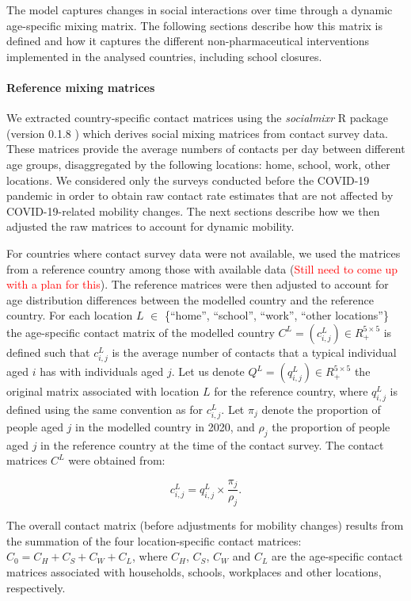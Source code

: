 The model captures changes in social interactions over time through a dynamic age-specific mixing matrix. The following
sections describe how this matrix is defined and how it captures the different non-pharmaceutical interventions implemented
in the analysed countries, including school closures.

\paragraph{Reference mixing matrices}
We extracted country-specific contact matrices using the \textit{socialmixr} R package (version 0.1.8 ) which derives social mixing matrices from 
contact survey data. These matrices provide the average numbers of contacts per day between different age groups, disaggregated by the following 
locations: home, school, work, other locations. We considered only the surveys conducted before the COVID-19 pandemic in order to obtain 
raw contact rate estimates that are not affected by COVID-19-related mobility changes. The next sections describe how we then adjusted 
the raw matrices to account for dynamic mobility.

For countries where contact survey data were not available, we used the matrices from a reference country among 
those with available data (\textcolor{red}{Still need to come up with a plan for this}). The reference matrices were 
then adjusted to account for age distribution differences between the modelled country and the reference country. For each 
location $L$ $\in$ \{``home'', ``school'', ``work'', ``other locations''\} the age-specific contact matrix of the modelled country $C^L = (c_{i,j}^L) \in R_{+}^{5 \times 5}$ 
is defined such that $c_{i,j}^L$ is the average number of contacts that a typical individual aged $i$ has with individuals aged $j$. 
Let us denote $Q^L = (q_{i,j}^L) \in R_{+}^{5 \times 5}$ the original matrix associated with location $L$ for the reference country, where $q_{i,j}^L$ is defined using the same 
convention as for $c_{i,j}^L$. Let $\pi_j$ denote the proportion of people aged $j$ in the modelled country in 2020, and $\rho_j$ the proportion of people aged $j$ in the reference country 
at the time of the contact survey. 
The contact matrices $C^L$ were obtained from:

\begin{equation}
  c_{i,j}^L = q_{i,j}^L \times \frac{\pi_j}{\rho_j} . 
\end{equation}

The overall contact matrix (before adjustments for mobility changes) results from the summation of the four location-specific 
contact matrices: \(C_{0}=C_{H}+C_{S}+C_{W}+C_{L}\), where \(C_{H}\), \(C_{S}\), \(C_{W}\) and \(C_{L}\) are the age-specific
contact matrices associated with households, schools, workplaces and other locations, respectively.

